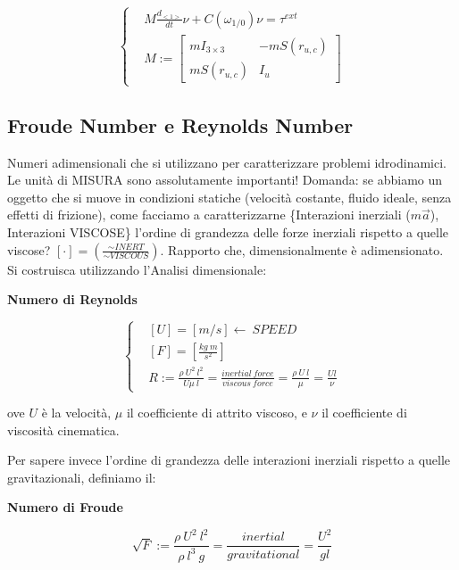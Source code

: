 \[
	\left\{
	\begin{aligned}
	&M\frac{d_{<1>}}{dt}\nu + C(\omega_{1/0})\nu = \tau^{ext}\\
	&M := \begin{bmatrix}mI_{3\times 3}&-mS(r_{u,c})\\mS(r_{u,c})&I_u\end{bmatrix}
	\end{aligned}
	\right.
\]

\subsection{Froude Number e Reynolds Number}

Numeri adimensionali che si utilizzano per caratterizzare problemi idrodinamici. Le unità di MISURA sono assolutamente importanti! Domanda: se abbiamo un oggetto che si muove in condizioni statiche (velocità costante, fluido ideale, senza effetti di frizione), come facciamo a caratterizzarne \{Interazioni inerziali ($m\vec{a}$), Interazioni VISCOSE\} l'ordine di grandezza delle forze inerziali rispetto a quelle viscose? $[\mathord{\cdot}] = (\frac{\sim INERT}{\sim VISCOUS})$. Rapporto che, dimensionalmente è adimensionato. Si costruisca utilizzando l'Analisi dimensionale: 

\begin{defn}{\textbf{Numero di Reynolds}}

\[	
	\left\{
	\begin{aligned}
	&[U] = [m/s] \leftarrow\ SPEED\\
	&[F] = [\frac{kg\ m}{s^2}]\\
	&R := \frac{\rho\ U^2\ l^2}{U\mu\ l} = \frac{inertial\ force}{viscous\ force} = \frac{\rho\ U\ l}{\mu} = \frac{Ul}{\nu}
	\end{aligned}
	\right.
\]

\end{defn}

ove $U$ è la velocità, $\mu$ il coefficiente di attrito viscoso, e $\nu$ il coefficiente di viscosità cinematica.

Per sapere invece l'ordine di grandezza delle interazioni inerziali rispetto a quelle gravitazionali, definiamo il:

\begin{defn}{\textbf{Numero di Froude}}

\[
	\sqrt{F} := \frac{\rho\ U^2\ l^2}{\rho\ l^3\ g} = \frac{inertial}{gravitational} = \frac{U^2}{gl}
\]

\end{defn}

